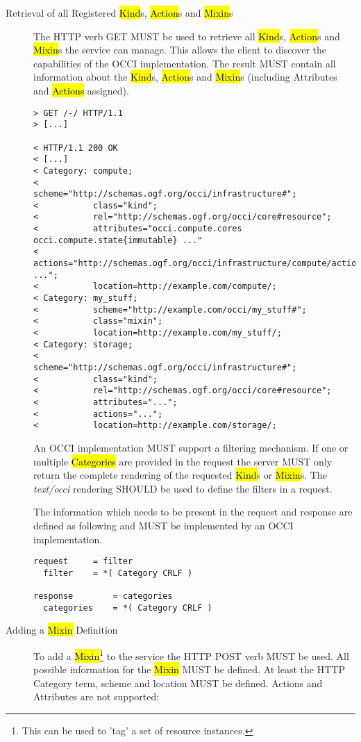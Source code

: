 \documentclass[10pt,a4paper]{article}
\begin{document}
\begin{description}
  \item[Retrieval of all Registered \hl{Kind}s, \hl{Action}s and
    \hl{Mixin}s] The HTTP verb GET MUST be used to retrieve all
    \hl{Kind}s, \hl{Action}s and \hl{Mixin}s the service can
    manage. This allows the client to discover the capabilities of the
    OCCI implementation. The result MUST contain all information about
    the \hl{Kind}s, \hl{Action}s and \hl{Mixin}s (including Attributes
    and \hl{Actions} assigned).

\begin{verbatim}
> GET /-/ HTTP/1.1
> [...]
 
< HTTP/1.1 200 OK
< [...]
< Category: compute;
<           scheme="http://schemas.ogf.org/occi/infrastructure#";
<           class="kind";
<           rel="http://schemas.ogf.org/occi/core#resource";
<           attributes="occi.compute.cores occi.compute.state{immutable} ..."
<           actions="http://schemas.ogf.org/occi/infrastructure/compute/action#stop ...";
<           location=http://example.com/compute/;
< Category: my_stuff;
<           scheme="http://example.com/occi/my_stuff#";
<           class="mixin";
<           location=http://example.com/my_stuff/;
< Category: storage;
<           scheme="http://schemas.ogf.org/occi/infrastructure#";
<           class="kind";
<           rel="http://schemas.ogf.org/occi/core#resource";
<           attributes="...";
<           actions="...";
<           location=http://example.com/storage/;
\end{verbatim}

    An OCCI implementation MUST support a filtering mechanism. If one
    or multiple \hl{Categories} are provided in the request the server
    MUST only return the complete rendering of the requested
    \hl{Kind}s or \hl{Mixin}s. The \emph{text/occi} rendering SHOULD
    be used to define the filters in a request.

    The information which needs to be present in the request and
    response are defined as following and MUST be implemented by an
    OCCI implementation.

\begin{verbatim}
request     = filter
  filter    = *( Category CRLF )

response        = categories
  categories    = *( Category CRLF )
\end{verbatim}

  \item[Adding a \hl{Mixin} Definition] To add a
    \hl{Mixin}\footnote{This can be used to 'tag' a set of resource
      instances.} to the service the HTTP POST verb MUST be used. All
    possible information for the \hl{Mixin} MUST be defined. At least
    the HTTP Category term, scheme and location MUST be
    defined. Actions and Attributes are not supported:


\end{description}
\end{document}
